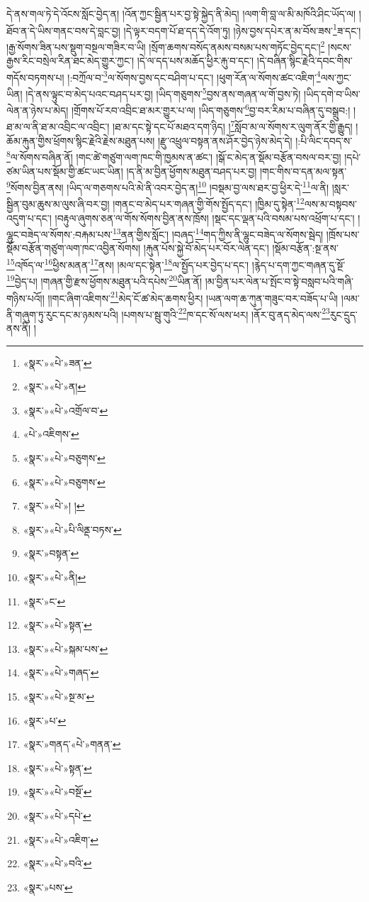 དེ་ནས་གལ་ཏེ་དེ་འོངས་སློང་བྱེད་ན། །འོན་ཀྱང་སྦྱིན་པར་བྱ་སྟེ་སྐྱེད་ནི་མེད། །ལག་གི་བླ་ལ་མི་མཁོའི་ཤིང་ཡོད་ལ། །ཐོབ་ན་དེ་ཡིས་གནང་བས་དེ་བླང་བྱ། །དེ་ལྟར་བདག་པོ་ཐ་དད་དེ་འོག་ཏུ། །ཉེས་བྱས་དཔེར་ན་མ་བོས་ཟས་\footnote{«སྣར་»«པེ་»ཟན་}ཟ་དང་། །རྒྱ་སོགས་ཟིན་པས་སྡུག་བསྔལ་གཟིར་བ་ཡི། །སྲོག་ཆགས་བསོད་ནམས་བསམ་པས་གཏོང་བྱེད་དང་།\footnote{«སྣར་»«པེ་»ན།} །སངས་རྒྱས་རིང་བསྲེལ་རིན་ཐང་མེད་གྱུར་ཀྱང་། །དེ་ལ་དད་པས་མཆོད་ཕྱིར་རྐུ་བ་དང་། །དེ་བཞིན་སྙིང་རྗེའི་དབང་གིས་གདོས་བཏགས་པ། །:བཀྲོལ་བ་\footnote{«སྣར་»«པེ་»འགྲོལ་བ་}ལ་སོགས་བྱས་དང་བཤིག་པ་དང་། །ཕུག་རོན་ལ་སོགས་ཚང་འཇིག་\footnote{«པེ་»འཇིགས་}ལས་ཀྱང་ཡིན། །དེ་ནས་ལྟུང་བ་མེད་པའང་བཤད་པར་བྱ། །ཡིད་གཅུགས་\footnote{«སྣར་»«པེ་»བཅུགས་}བྱས་ནས་གཞན་ལ་གོ་བྱས་ཏེ། །ཡིད་དགེ་བ་ཡིས་ལེན་ན་ཉེས་པ་མེད། །གྲོགས་པོ་རབ་འབྲིང་ཐ་མར་གྱུར་པ་ལ། །ཡིད་གཅུགས་\footnote{«སྣར་»«པེ་»བཅུགས་}བྱ་བར་རིམ་པ་བཞིན་དུ་བསྒྲུབ:། །ཐ་མ་ལ་ནི་ཐ་མ་འབྲིང་ལ་འབྲིང་། །ཐ་མ་དང་སྟེ་དང་པོ་མཐའ་དག་ཉིད། །\footnote{«སྣར་»«པེ་»། །}སློབ་མ་ལ་སོགས་ར་ལུག་ནོར་གྱི་རྒྱུད། །ཆོམ་རྐུན་གྱིས་ཕྲོགས་སྙིང་རྗེའི་རྗེས་མཐུན་པས། །རྫུ་འཕྲུལ་བསྟན་ནས་ཤོར་བྱེད་ཉེས་མེད་དེ། །:པི་ལིང་དབད་ས་\footnote{«སྣར་»«པེ་»པི་ལིནྡ་བཏས་}ལ་སོགས་བཞིན་ནོ། །གང་ཚེ་གཙུག་ལག་ཁང་གི་ཁྱམས་ན་ཚང་། །སྒོ་ང་མེད་ན་སྡོམ་བརྩོན་བསལ་བར་བྱ། །དཔེ་ཙམ་ཡིན་པས་སྡོམ་གྱི་ཚང་ཡང་ཡིན། །ད་ནི་མ་བྱིན་ཕྱོགས་མཐུན་བཤད་པར་བྱ། །གང་གིས་བ་དན་མལ་སྟན་\footnote{«སྣར་»བསྟན་}སོགས་བྱིན་ནས། །ཡིད་ལ་གཅགས་པའི་མེ་ནི་འབར་བྱེད་ན།\footnote{«སྣར་»«པེ་»ནི།} །བསྡམ་བྱ་ལས་ཐར་བྱ་ཕྱིར་དེ་\footnote{«སྣར་»ང་}ལ་ནི། །སླར་སྦྱིན་བུམ་ཆུས་མ་ལུས་ཞི་བར་བྱ། །གནང་བ་མེད་པར་གཞན་གྱི་གོས་སྤྱོད་དང་། །ཁྱིམ་དུ་སྟེན་\footnote{«སྣར་»«པེ་»སྟན་}ལས་མ་བསྟབས་འདུག་པ་དང་། །བརྟུལ་ཞུགས་ཅན་ལ་གོས་སོགས་བྱིན་ནས་ཁྲོས། །སྡང་དང་ལྡན་པའི་བསམ་པས་འཕྲོག་པ་དང་། །ལྷུང་བཟེད་ལ་སོགས་:བརྐམ་པས་\footnote{«སྣར་»«པེ་»སྐམ་པས་}ནན་གྱིས་སློང་། །བཞད་\footnote{«སྣར་»«པེ་»གཞད་}གད་ཀྱིས་ནི་ལྷུང་བཟེད་ལ་སོགས་སྦེད། །ཁྲོས་པས་སྡོམ་བརྩོན་གཙུག་ལག་ཁང་འབྱིན་སོགས། །རྐུན་པོས་སྐྱེ་བོ་མེད་པར་བོར་ལེན་དང་། །སྡོམ་བརྩོན་:སྔ་ནས་\footnote{«སྣར་»«པེ་»སྔ་མ་}འཁོད་ལ་\footnote{«སྣར་»པ་}ཕྱིས་མནན་\footnote{«སྣར་»གནད་«པེ་»གནན་}ནས། །མལ་དང་སྟེན་\footnote{«སྣར་»«པེ་»སྟན་}ལ་སྤྱོད་པར་བྱེད་པ་དང་། །རྙེད་པ་དག་ཀྱང་གཞན་དུ་སྔོ་\footnote{«སྣར་»«པེ་»བསྔོ་}བྱེད་པ། །གཞན་གྱི་རྫས་ཕྱོགས་མཐུན་པའི་དཔེས་\footnote{«སྣར་»«པེ་»དཔེ་}ཡིན་ནོ། །མ་བྱིན་པར་ལེན་པ་སྤོང་བ་སྟེ་བསླབ་པའི་གཞི་གཉིས་པའོ།། །།གང་ཞིག་འཇིགས་\footnote{«སྣར་»«པེ་»འཇིག་}མེད་ངོ་ཚ་མེད་ཆགས་ཕྱིར། །ཡན་ལག་ཆ་ཀུན་གཟུང་བར་བཟོད་པ་ཡི། །ལམ་ནི་གཞུག་ཏུ་རུང་དང་མ་ཉམས་པའི། །པགས་པ་སྦུ་གུའི་\footnote{«སྣར་»«པེ་»བའི་}ཁ་དང་སོ་ལས་ཕར། །ནོར་བུ་ནད་མེད་ལས་\footnote{«སྣར་»པས་}རུང་དྲུད་ནས་ནི། །
